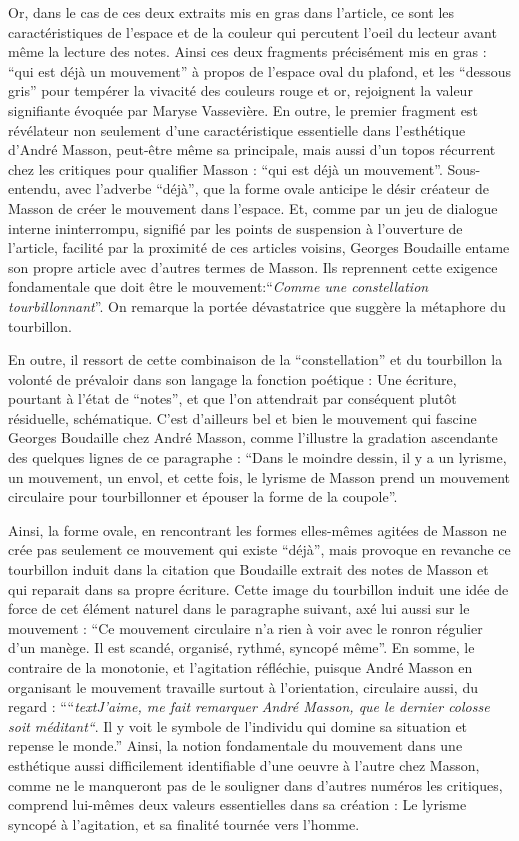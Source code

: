 {	 Or, dans le cas de ces deux extraits mis en gras dans l'article, ce sont les caractéristiques de l’espace et de la couleur qui percutent l’oeil du lecteur avant même la lecture des notes. Ainsi ces deux fragments précisément mis en gras : \enquote{qui est déjà un mouvement} à propos de l’espace oval du plafond, et  les \enquote{dessous gris} pour tempérer la vivacité des couleurs rouge et or, rejoignent la valeur signifiante évoquée par Maryse Vassevière. En outre, le premier fragment est révélateur non seulement d’une caractéristique essentielle dans l’esthétique d’André Masson, peut-être même sa principale, mais aussi d’un topos récurrent chez les critiques pour qualifier Masson : \enquote{qui est déjà un mouvement}. Sous-entendu, avec l’adverbe \enquote{déjà}, que la forme ovale anticipe le désir créateur de Masson de créer le mouvement dans l’espace. Et, comme par un jeu de dialogue interne ininterrompu, signifié par les points de suspension à l’ouverture de l’article, facilité par la proximité de ces articles voisins, Georges Boudaille entame son propre article avec d’autres termes de Masson. Ils reprennent cette exigence fondamentale que doit être le mouvement:\enquote{\emph{Comme une constellation tourbillonnant}}.  On remarque la portée dévastatrice que suggère la métaphore du tourbillon. 

	En outre, il  ressort de cette combinaison de la \enquote{constellation} et du tourbillon la volonté de prévaloir dans son langage la fonction poétique : Une écriture, pourtant à l’état de \enquote{notes}, et que l’on attendrait par conséquent plutôt résiduelle, schématique. C’est d’ailleurs bel et bien le mouvement qui fascine Georges Boudaille chez André Masson, comme l’illustre la gradation ascendante des quelques lignes de ce paragraphe : \enquote{Dans le moindre dessin, il y a un lyrisme, un mouvement, un envol, et cette fois, le lyrisme de Masson prend un mouvement circulaire pour tourbillonner et épouser la forme de la coupole}. 

	Ainsi, la forme ovale, en rencontrant les formes elles-mêmes agitées de Masson ne crée pas seulement ce mouvement qui existe \enquote{déjà}, mais provoque en revanche ce tourbillon induit dans la citation que Boudaille extrait des notes de Masson et qui reparait dans sa propre écriture. Cette image du tourbillon induit une idée de force de cet élément naturel dans le paragraphe suivant, axé lui aussi sur le mouvement : \enquote{Ce mouvement circulaire n’a rien à voir avec le ronron régulier d’un manège. Il est scandé, organisé, rythmé, syncopé même}. En somme, le contraire de la monotonie, et l’agitation réfléchie, puisque André Masson en organisant le mouvement travaille surtout à l’orientation, circulaire aussi, du regard : \enquote{“\emph{textJ’aime, me fait remarquer André Masson, que le dernier colosse soit méditant“}. Il y voit le symbole de l’individu qui domine sa situation et repense le monde.} Ainsi, la notion fondamentale du mouvement dans une esthétique aussi difficilement identifiable d’une oeuvre à l’autre chez Masson, comme ne le manqueront pas de le souligner dans d’autres numéros les critiques, comprend lui-mêmes deux valeurs essentielles dans sa création : Le lyrisme syncopé à l’agitation, et sa finalité tournée vers l’homme. 

}
